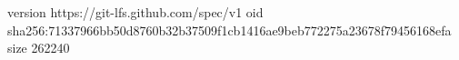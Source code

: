 version https://git-lfs.github.com/spec/v1
oid sha256:71337966bb50d8760b32b37509f1cb1416ae9beb772275a23678f79456168efa
size 262240
